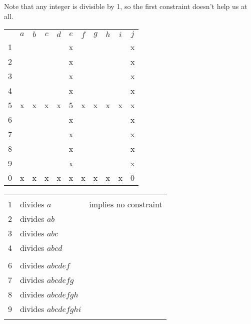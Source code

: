 Note that any integer is divisible by 1, so the first constraint doesn't help us at all.
\begin{center}
\begin{tabular}{ccccccccccc}
			&	$a$	&	$b$	&	$c$	&	$d$	&	$e$	&	$f$	&	$g$	&	$h$	&	$i$	&	$j$	\\
	1		&		&		&		&		&	x	&		&		&		&		&	x	\\
	2		&		&		&		&		&	x	&		&		&		&		&	x	\\
	3		&		&		&		&		&	x	&		&		&		&		&	x	\\
	4		&		&		&		&		&	x	&		&		&		&		&	x	\\
	5		&	x	&	x	&	x	&	x	&	5	&	x	&	x	&	x	&	x	&	x	\\
	6		&		&		&		&		&	x	&		&		&		&		&	x	\\
	7		&		&		&		&		&	x	&		&		&		&		&	x	\\
	8		&		&		&		&		&	x	&		&		&		&		&	x	\\
	9		&		&		&		&		&	x	&		&		&		&		&	x	\\
	0		&	x	&	x	&	x	&	x	&	x	&	x	&	x	&	x	&	x	&	0	\\
\end{tabular}
\hspace{1cm}\vline\hspace{1cm}
\begin{tabular}{rll}
	& 		\\
	1	&	divides $a$					& implies no constraint	\\
	2	&	divides $ab$					\\
	3	&	divides $abc$					\\
	4	&	divides $abcd$					\\
		&	\\
	6	&	divides $abcdef$				\\
	7	&	divides $abcdefg$				\\
	8	&	divides $abcdefgh$				\\
	9	&	divides $abcdefghi$				\\
		&	
\end{tabular}
\end{center}

